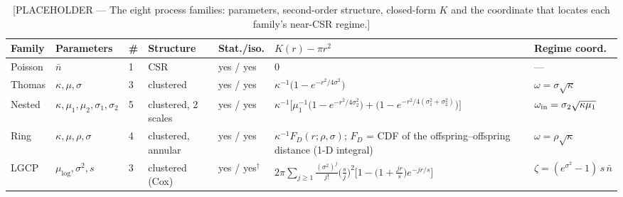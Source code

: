 \documentclass[twoside]{article}
\newcommand{\nb}{\bar n}
\begin{document}
\begin{table}[t]
\caption{[PLACEHOLDER — The eight process families: parameters, second-order structure, closed-form $K$ and the
coordinate that locates each family's near-CSR regime.]}
\label{tab:families}
\begin{center}
\footnotesize
\begin{tabular}{@{}lllll p{5.4cm} l@{}}
\toprule
Family & Parameters & \# & Structure & Stat./iso. & $K(r)-\pi r^2$ & Regime coord. \\
\midrule
Poisson      & $\nb$ & 1 & CSR & yes / yes & $0$ & --- \\
Thomas       & $\kappa,\mu,\sigma$ & 3 & clustered & yes / yes & $\kappa^{-1}\bigl(1-e^{-r^2/4\sigma^2}\bigr)$ & $\omega=\sigma\sqrt\kappa$ \\
Nested       & $\kappa,\mu_1,\mu_2,\sigma_1,\sigma_2$ & 5 & clustered, 2 scales & yes / yes &
  $\kappa^{-1}\bigl[\mu_1^{-1}\bigl(1-e^{-r^2/4\sigma_2^2}\bigr)+\bigl(1-e^{-r^2/4(\sigma_1^2+\sigma_2^2)}\bigr)\bigr]$ &
  $\omega_{\rm in}=\sigma_2\sqrt{\kappa\mu_1}$ \\
Ring         & $\kappa,\mu,\rho,\sigma$ & 4 & clustered, annular & yes / yes &
  $\kappa^{-1}F_D(r;\rho,\sigma)$; $F_D$ = CDF of the offspring--offspring distance (1-D integral) & $\omega=\rho\sqrt\kappa$ \\
LGCP         & $\mu_{\log},\sigma^2,s$ & 3 & clustered (Cox) & yes / yes$^\dagger$ &
  $2\pi\sum_{j\ge1}\frac{(\sigma^2)^j}{j!}\bigl(\frac{s}{j}\bigr)^2\bigl[1-\bigl(1+\frac{jr}{s}\bigr)e^{-jr/s}\bigr]$ &
  $\zeta=(e^{\sigma^2}-1)\,s\,\nb$ \\

\end{tabular}
\end{center}
\end{table}
\end{document}
